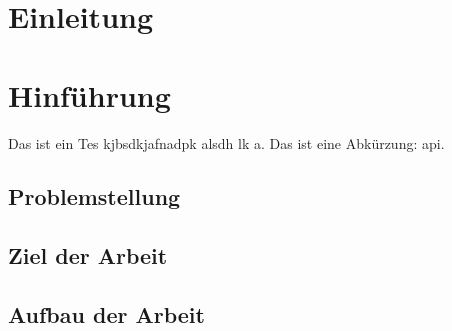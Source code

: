 \section{Einleitung}

\section{Hinführung}
Das ist ein Tes kjbsdkjafnadpk alsdh lk a. Das ist eine Abkürzung: \ac{api}.\autocite[vgl.][S. 20]{book:SimulationMechatronischerSysteme}
    
        
\subsection{Problemstellung}
    
    
\subsection{Ziel der Arbeit}
    
    
\subsection{Aufbau der Arbeit}
    
